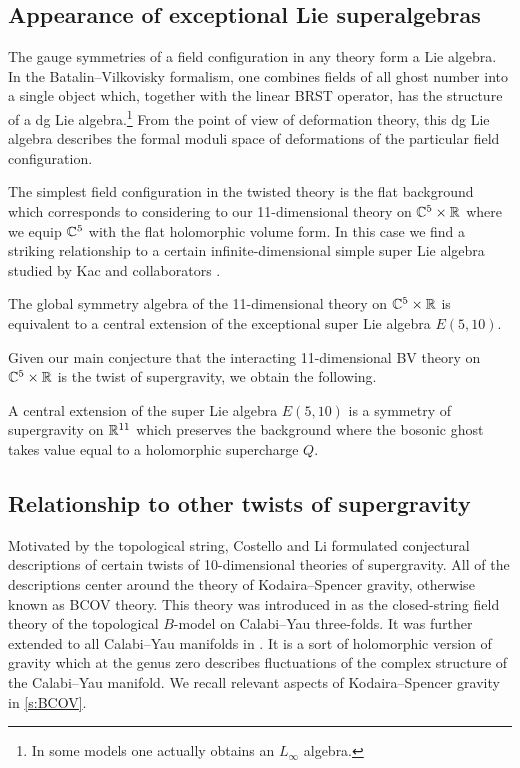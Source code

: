 \subsection*{Appearance of exceptional Lie superalgebras}

The gauge symmetries of a field configuration in any theory form a Lie algebra. 
In the Batalin--Vilkovisky formalism, one combines fields of all ghost number into a single object which, together with the linear BRST operator, has the structure of a dg Lie algebra.\footnote{In some models one actually obtains an $L_\infty$ algebra.} 
From the point of view of deformation theory, this dg Lie algebra describes the formal moduli space of deformations of the particular field configuration. 

The simplest field configuration in the twisted theory is the flat background which corresponds to considering to our 11-dimensional theory on $\mathbb C^5 \times \mathbb R$ where we equip $\mathbb C^5$ with the flat holomorphic volume form. 
In this case we find a striking relationship to a certain infinite-dimensional simple super Lie algebra studied by Kac and collaborators \cite{KacBible,KacE510}.

\begin{thm}
The global symmetry algebra of the 11-dimensional theory on $\mathbb C^5 \times \mathbb R$ is equivalent to a central extension of the exceptional super Lie algebra $E(5,10)$. 
\end{thm}

Given our main conjecture that the interacting 11-dimensional BV theory on $\mathbb C^5 \times \mathbb R$ is the twist of supergravity, we obtain the following.

\begin{conj} 
A central extension of the super Lie algebra $E(5,10)$ is a symmetry of supergravity on $\mathbb R^{11}$ which preserves the background where the bosonic ghost takes value equal to a holomorphic supercharge $Q$.
\end{conj}

\subsection*{Relationship to other twists of supergravity} 

Motivated by the topological string, Costello and Li formulated conjectural descriptions of certain twists of 10-dimensional theories of supergravity. 
All of the descriptions center around the theory of Kodaira--Spencer gravity, otherwise known as BCOV theory. 
This theory was introduced in \cite{BCOV} as the closed-string field theory of the topological $B$-model on Calabi--Yau three-folds.
It was further extended to all Calabi--Yau manifolds in \cite{CLbcov1}. 
It is a sort of holomorphic version of gravity which at the genus zero  describes fluctuations of the complex structure of the Calabi--Yau manifold. 
We recall relevant aspects of Kodaira--Spencer gravity in \ref{s:BCOV}. 

